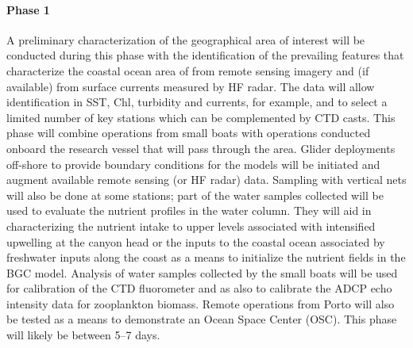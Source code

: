 \paragraph{Phase 1} A preliminary characterization of the geographical
area of interest will be conducted during this phase with the
identification of the prevailing features that characterize the coastal
ocean area of \naz from remote sensing imagery and (if available) from
surface currents measured by HF radar. The data will allow
identification in SST, Chl, turbidity and currents, for example, and to
select a limited number of key stations which can be complemented by CTD
casts. %
This phase will combine operations from small boats with operations
conducted onboard the \inst research vessel that will pass through the
area. Glider deployments off-shore to provide boundary conditions for
the models will be initiated and augment available remote sensing (or
HF radar) data. Sampling with vertical nets will also be done at some
stations; part of the water samples collected will be used to evaluate
the nutrient profiles in the water column. %
They will aid in characterizing the nutrient intake to upper levels
associated with intensified upwelling at the canyon head or the inputs
to the coastal ocean associated by freshwater inputs along the coast
as a means to initialize the nutrient fields in the BGC
model. Analysis of water samples collected by the small boats will be
used for calibration of the CTD fluorometer and as also to calibrate
the ADCP echo intensity data for zooplankton biomass. Remote
operations from Porto will also be tested as a means to demonstrate an
Ocean Space Center (OSC). This phase will likely be between 5--7 days.

 

